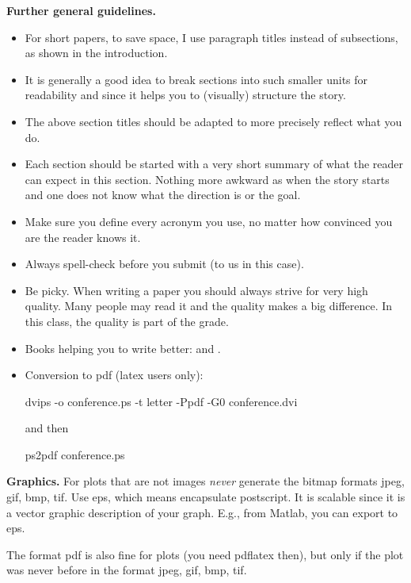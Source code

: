 \documentclass[letterpaper]{article}
\newcommand{\mypar}[1]{{\bf #1.}}
\begin{document}
\mypar{Further general guidelines}

\begin{itemize}
\item For short papers, to save space, I use paragraph titles instead of
subsections, as shown in the introduction.

\item It is generally a good idea to break sections into such smaller
units for readability and since it helps you to (visually) structure the story.

\item The above section titles should be adapted to more precisely
reflect what you do.

\item Each section should be started with a very
short summary of what the reader can expect in this section. Nothing
more awkward as when the story starts and one does not know what the
direction is or the goal.

\item Make sure you define every acronym you use, no matter how
convinced you are the reader knows it.

\item Always spell-check before you submit (to us in this case).

\item Be picky. When writing a paper you should always strive for very
high quality. Many people may read it and the quality makes a big difference.
In this class, the quality is part of the grade.

\item Books helping you to write better: \cite{Higham:98} and \cite{Strunk:00}.

\item Conversion to pdf (latex users only): 

dvips -o conference.ps -t letter -Ppdf -G0 conference.dvi

and then

ps2pdf conference.ps
\end{itemize}

\mypar{Graphics} For plots that are not images {\em never} generate the bitmap formats
jpeg, gif, bmp, tif. Use eps, which means encapsulate postscript. It is
scalable since it is a vector graphic description of your graph. E.g.,
from Matlab, you can export to eps.

The format pdf is also fine for plots (you need pdflatex then), but only if the plot was never before in the format 
jpeg, gif, bmp, tif.




\end{document}
